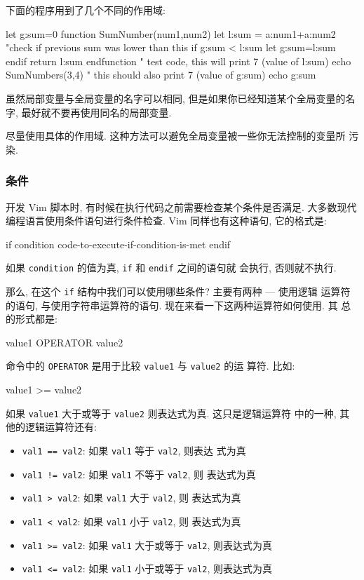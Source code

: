 下面的程序用到了几个不同的作用域:
\begin{vimcode}
let g:sum=0
function SumNumber(num1,num2)
    let l:sum = a:num1+a:num2
    "check if previous sum was lower than this
    if g:sum < l:sum
        let g:sum=l:sum
    endif
    return l:sum
endfunction
" test code, this will print 7 (value of l:sum)
echo SumNumbers(3,4)
" this should also print 7 (value of g:sum)
echo g:sum
\end{vimcode}

虽然局部变量与全局变量的名字可以相同, 但是如果你已经知道某个全局变量的名字,
最好就不要再使用同名的局部变量.

\begin{warning}
    尽量使用具体的作用域. 这种方法可以避免全局变量被一些你无法控制的变量所
    污染.
\end{warning}

\subsubsection{条件}
\label{subsubsec:conditions}

开发 Vim 脚本时, 有时候在执行代码之前需要检查某个条件是否满足. 大多数现代
编程语言使用条件语句进行条件检查. Vim 同样也有这种语句, 它的格式是:
\begin{vimcode}
if condition
    code-to-execute-if-condition-is-met
endif
\end{vimcode}
如果 \texttt{condition} 的值为真, \texttt{if} 和 \texttt{endif} 之间的语句就
会执行, 否则就不执行.

那么, 在这个 \texttt{if} 结构中我们可以使用哪些条件? 主要有两种 --- 使用逻辑
运算符的语句, 与使用字符串运算符的语句. 现在来看一下这两种运算符如何使用. 其
总的形式都是:
\begin{vimcode}
value1 OPERATOR value2
\end{vimcode}
命令中的 \texttt{OPERATOR} 是用于比较 \texttt{value1} 与 \texttt{value2} 的运
算符. 比如:
\begin{vimcode}
value1 >= value2
\end{vimcode}
如果 \texttt{value1} 大于或等于 \texttt{value2} 则表达式为真. 这只是逻辑运算符
中的一种, 其他的逻辑运算符还有:
\begin{itemize}
    \item \texttt{val1 == val2}: 如果 \texttt{val1} 等于 \texttt{val2}, 则表达
        式为真
    \item \texttt{val1 != val2}: 如果 \texttt{val1} 不等于 \texttt{val2}, 则
        表达式为真
    \item \texttt{val1 > val2}: 如果 \texttt{val1} 大于 \texttt{val2}, 则
        表达式为真
    \item \texttt{val1 < val2}: 如果 \texttt{val1} 小于 \texttt{val2}, 则
        表达式为真
    \item \texttt{val1 >= val2}: 如果 \texttt{val1} 大于或等于 \texttt{val2},
        则表达式为真
    \item \texttt{val1 <= val2}: 如果 \texttt{val1} 小于或等于 \texttt{val2},
        则表达式为真
\end{itemize}

